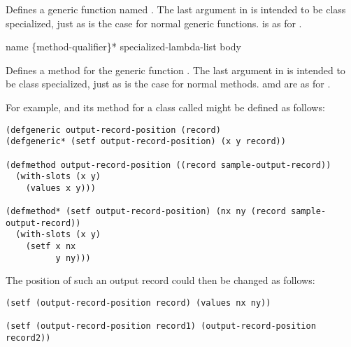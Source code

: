 Defines a  generic function named .  The last argument in
 is intended to be class specialized, just as is the case for
normal  generic functions.   is as for .

 {name \{method-qualifier\}* specialized-lambda-list \body body}

Defines a  method for the generic function .  The last
argument in  is intended to be class specialized,
just as is the case for normal  methods.  
amd  are as for .


For example,  and its  method for a class
called  might be defined as follows:

\begin{verbatim}
(defgeneric output-record-position (record)
(defgeneric* (setf output-record-position) (x y record))

(defmethod output-record-position ((record sample-output-record))
  (with-slots (x y)
    (values x y)))

(defmethod* (setf output-record-position) (nx ny (record sample-output-record))
  (with-slots (x y)
    (setf x nx
          y ny)))
\end{verbatim}

The position of such an output record could then be changed as follows:

\begin{verbatim}
(setf (output-record-position record) (values nx ny))

(setf (output-record-position record1) (output-record-position record2))
\end{verbatim}


